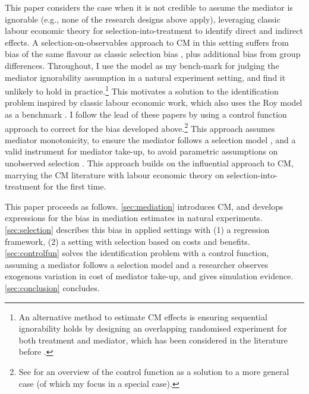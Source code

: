 This paper considers the case when it is not credible to assume the mediator is ignorable (e.g., none of the research designs above apply), leveraging classic labour economic theory for selection-into-treatment to identify direct and indirect effects.
A selection-on-observables approach to CM in this setting suffers from bias of the same flavour as classic selection bias \citep{heckman1998characterizing}, plus additional bias from group differences.
Throughout, I use the \cite{roy1951some} model as my bench-mark for judging the \cite{imai2010identification} mediator ignorability assumption in a natural experiment setting, and find it unlikely to hold in practice.\footnote{
    An alternative method to estimate CM effects is ensuring sequential ignorability holds by designing an overlapping randomised experiment for both treatment and mediator, which has been considered in the literature before \citep{ludwig2011mechanism,imai2013experimental}.
}
This motivates a solution to the identification problem inspired by classic labour economic work, which also uses the Roy model as a benchmark \citep{heckman1979sample,heckman1990empirical}.
I follow the lead of these papers by using a control function approach to correct for the bias developed above.\footnote{
    See \cite{imbens2007nonadditive} for an overview of the control function as a solution to a more general case (of which my focus in a special case).
}
This approach assumes mediator monotonicity, to ensure the mediator follows a selection model \citep{vytlacil2002independence}, and a valid instrument for mediator take-up, to avoid parametric assumptions on unobserved selection \citep{heckman2004using}.
This approach builds on the influential \cite{imai2010identification} approach to CM, marrying the CM literature with labour economic theory on selection-into-treatment for the first time. 

This paper proceeds as follows.
\autoref{sec:mediation} introduces CM, and develops expressions for the bias in mediation estimates in natural experiments.
\autoref{sec:selection} describes this bias in applied settings with (1) a regression framework, (2) a setting with selection based on costs and benefits.
\autoref{sec:controlfun} solves the identification problem with a control function, assuming a mediator follows a selection model and a researcher observes exogenous variation in cost of mediator take-up, and gives simulation evidence.
\autoref{sec:conclusion} concludes.
